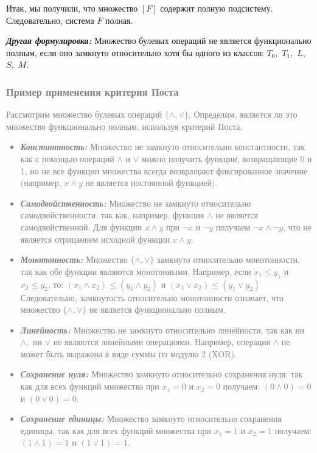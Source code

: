 \documentclass[12pt,letterpaper]{article}
\begin{document}
Итак, мы получили, что множество \(\left[ F \right]\) содержит полную подсистему. Следовательно, система \(F\) полная.

\textbf{\emph{Другая формулировка:}} Множество булевых операций не является функционально полным, если оно замкнуто относительно хотя бы одного из классов: \(T_0,\) \(T_1,\) \(L,\) \(S,\) \(M.\)

\textcolor{gray}{\subsubsection{Пример применения критерия Поста}}

\textcolor{gray}{Рассмотрим множество булевых операций \(\{\wedge, \vee\}.\) Определим, является ли это множество функционально полным, используя критерий Поста.}

\textcolor{gray}{\begin{itemize}
  \item \textbf{\emph{Константность:}} Множество не замкнуто относительно константности, так как с помощью операций \(\wedge\) и \(\vee\) можно получить функции, возвращающие 0 и 1, но не все функции множества всегда возвращают фиксированное значение (например, \(x \wedge y\) не является постоянной функцией).
  \item \textbf{\emph{Самодвойственность:}} Множество не замкнуто относительно самодвойственности, так как, например, функция \(\wedge\) не является самодвойственной. Для функции \(x \wedge y\) при \(\neg x\) и \(\neg y\) получаем \(\neg x \wedge \neg y\), что не является отрицанием исходной функции \(x \wedge y\).
  \item \textbf{\emph{Монотонность:}} Множество \(\{\wedge, \vee\}\) замкнуто относительно монотонности, так как обе функции являются монотонными. Например, если \(x_1 \leq y_1\) и \(x_2 \leq y_2\), то: \((x_1 \wedge x_2) \leq (y_1 \wedge y_2)\) и \((x_1 \vee x_2) \leq (y_1 \vee y_2)\)
  Следовательно, замкнутость относительно монотонности означает, что множество \(\{\wedge, \vee\}\) не является функционально полным.
  \item \textbf{\emph{Линейность:}} Множество не замкнуто относительно линейности, так как ни \(\wedge,\) ни \(\vee\) не являются линейными операциями. Например, операция \(\wedge\) не может быть выражена в виде суммы по модулю 2 (XOR).
  \item \textbf{\emph{Сохранение нуля:}} Множество замкнуто относительно сохранения нуля, так как для всех функций множества при \(x_1 = 0\) и \(x_2 = 0\) получаем: \((0 \wedge 0) = 0\) и \((0 \vee 0) = 0.\)
  \item \textbf{\emph{Сохранение единицы:}} Множество замкнуто относительно сохранения единицы, так как для всех функций множества при \(x_1 = 1\) и \(x_2 = 1\) получаем: \((1 \wedge 1) = 1\) и \((1 \vee 1) = 1\).
\end{itemize}}
\end{document}
